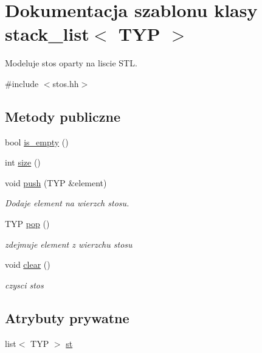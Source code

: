 \hypertarget{classstack__list}{\section{Dokumentacja szablonu klasy stack\-\_\-list$<$ T\-Y\-P $>$}
\label{classstack__list}
}


Modeluje stos oparty na liscie S\-T\-L.  




{\ttfamily \#include $<$stos.\-hh$>$}

\subsection*{Metody publiczne}
\begin{DoxyCompactItemize}
\item 
bool \hyperlink{classstack__list_a7f01744a7674ca41f55f2ea782360215}{is\-\_\-empty} ()
\item 
int \hyperlink{classstack__list_adcb1450ccbd547750e6a7939984a7c44}{size} ()
\item 
void \hyperlink{classstack__list_a7c8c94a164f180c87fa1d7a8be146a4c}{push} (T\-Y\-P \&element)
\begin{DoxyCompactList}\small\item\em Dodaje element na wierzch stosu. \end{DoxyCompactList}\item 
T\-Y\-P \hyperlink{classstack__list_aa77f6e528341ca41aefec405ebe6cd4f}{pop} ()
\begin{DoxyCompactList}\small\item\em zdejmuje element z wierzchu stosu \end{DoxyCompactList}\item 
void \hyperlink{classstack__list_afb284368d44ea1f2ab231c8f662deb5f}{clear} ()
\begin{DoxyCompactList}\small\item\em czysci stos \end{DoxyCompactList}\end{DoxyCompactItemize}
\subsection*{Atrybuty prywatne}
\begin{DoxyCompactItemize}
\item 
list$<$ T\-Y\-P $>$ \hyperlink{classstack__list_a3689c3e1f740bb83ec4471f0487a78a9}{st}
\end{DoxyCompactItemize}


